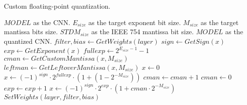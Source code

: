 \documentclass{article}
\begin{document}
\thispagestyle{empty} %

\begin{algorithm}[H]
    \caption{Custom floating-point quantization.}
    \label{alg:quantize_training}
    \begin{algorithmic}[1]
        \renewcommand{\algorithmicrequire}{\textbf{Input:}}
        \renewcommand{\algorithmicensure}{\textbf{Output:}}
        \Require $MODEL$ as the CNN.
        \Require $E_{size}$ as the target exponent bit size.
        \Require $M_{size}$ as the target mantissa bits size.
        \Require $STDM_{size}$ as the IEEE 754 mantissa bit size.
        \Ensure $MODEL$ as the quantized CNN.
                \State $filter, bias \gets GetWeights(layer)$
                    \State $sign \gets GetSign(x)$
                    \State $exp \gets GetExponent(x)$
                    \State $fullexp \gets 2^{E_{size}-1}-1$ 
                    \State $cman \gets GetCustomMantissa(x, M_{size})$
                    \State $leftman \gets GetLeftoverMantissa(x, M_{size})$
                        \State$x\gets0$
                        \State$x\gets (-1)^{sign}\cdot2^{fullexp}\cdot(1+(1-2^{-M_{size}}))$
                    \Else
                            \State $cman \gets cman+1$ 
                                \State $cman \gets 0$ 
                                \State $exp \gets exp + 1$
                            \EndIf
                        \EndIf
                        \State$x\gets (-1)^{sign}\cdot2^{exp}\cdot(1+cman\cdot2^{-M_{size}})$
                    \EndIf
                \EndFor
                \State $SetWeights(layer, filter, bias)$
            \EndIf
        \EndFor
    \end{algorithmic}
\end{algorithm}
\end{document}
